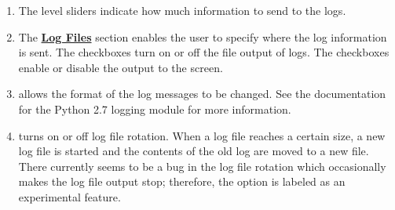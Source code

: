 \begin{enumerate}
	\item The level sliders indicate how much information to send to the logs.
	\item The \textbf{\underline{Log Files}} section enables the user to specify where the log information is sent. The  checkboxes turn on or off the file output of logs. The  checkboxes enable or disable the output to the screen.
	\item {} allows the format of the log messages to be changed. See the documentation for the Python 2.7 logging module for more information.
	\item {} turns on or off log file rotation. When a log file reaches a certain size, a new log file is started and the contents of the old log are moved to a new file. There currently seems to be a bug in the log file rotation which occasionally makes the log file output stop; therefore, the  option is labeled as an experimental feature.
\end{enumerate}
